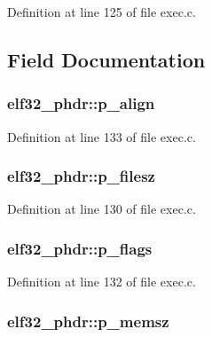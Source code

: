 Definition at line 125 of file exec.\+c.



\subsection{Field Documentation}
\hypertarget{structelf32__phdr_a36b59708697a8e025409ec1a2614acdf}{
\subsubsection[{p\+\_\+align}]{ elf32\+\_\+phdr\+::p\+\_\+align}}\label{structelf32__phdr_a36b59708697a8e025409ec1a2614acdf}


Definition at line 133 of file exec.\+c.

\hypertarget{structelf32__phdr_a4b9173c35966a1ad03681a72ceabe291}{
\subsubsection[{p\+\_\+filesz}]{ elf32\+\_\+phdr\+::p\+\_\+filesz}}\label{structelf32__phdr_a4b9173c35966a1ad03681a72ceabe291}


Definition at line 130 of file exec.\+c.

\hypertarget{structelf32__phdr_a988c9108c42fa294891b5f94d60cb06e}{
\subsubsection[{p\+\_\+flags}]{ elf32\+\_\+phdr\+::p\+\_\+flags}}\label{structelf32__phdr_a988c9108c42fa294891b5f94d60cb06e}


Definition at line 132 of file exec.\+c.

\hypertarget{structelf32__phdr_af44d75db8b3ebcfa04742e55b49e7eb6}{
\subsubsection[{p\+\_\+memsz}]{ elf32\+\_\+phdr\+::p\+\_\+memsz}}\label{structelf32__phdr_af44d75db8b3ebcfa04742e55b49e7eb6}


